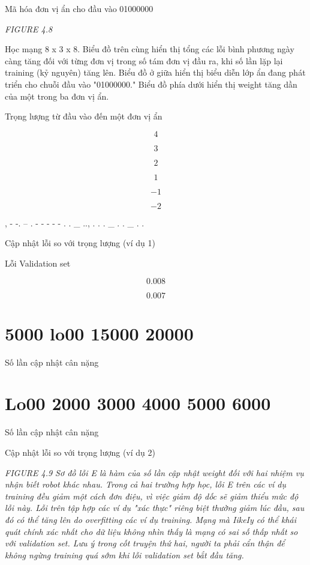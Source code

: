Mã hóa đơn vị ẩn cho đầu vào 01000000

\noindent\textit{FIGURE 4.8}

Học mạng 8 x 3 x 8. Biểu đồ trên cùng hiển thị tổng các lỗi bình phương ngày càng tăng đối với từng đơn vị trong số tám đơn vị đầu ra, khi số lần lặp lại training (kỷ nguyên) tăng lên. Biểu đồ ở giữa hiển thị biểu diễn lớp ẩn đang phát triển cho chuỗi đầu vào "01000000." Biểu đồ phía dưới hiển thị weight tăng dần của một trong ba đơn vị ẩn.

Trọng lượng từ đầu vào đến một đơn vị ẩn

\[4\]

\[3\]

\[2\]

\[1\]

\[-1\]

\[-2\]

, - -. -- . - - - - - . . \_ .., . . . \_ . . \_ . .

Cập nhật lỗi so với trọng lượng (ví dụ 1)

Lỗi Validation set

\[0.008\]

\[0.007\]

\section{5000 lo00 15000 20000}

Số lần cập nhật cân nặng

\section{Lo00 2000 3000 4000 5000 6000}

Số lần cập nhật cân nặng

Cập nhật lỗi so với trọng lượng (ví dụ 2)

\noindent\textit{FIGURE 4.9 Sơ đồ lỗi E là hàm của số lần cập nhật weight đối với hai nhiệm vụ nhận biết robot khác nhau. Trong cả hai trường hợp học, lỗi E trên các ví dụ training đều giảm một cách đơn điệu, vì việc giảm độ dốc sẽ giảm thiểu mức độ lỗi này. Lỗi trên tập hợp các ví dụ "xác thực" riêng biệt thường giảm lúc đầu, sau đó có thể tăng lên do overfitting các ví dụ training. Mạng mà IikeIy có thể khái quát chính xác nhất cho dữ liệu không nhìn thấy là mạng có sai số thấp nhất so với validation set. Lưu ý trong cốt truyện thứ hai, người ta phải cẩn thận để không ngừng training quá sớm khi lỗi validation set bắt đầu tăng.}

